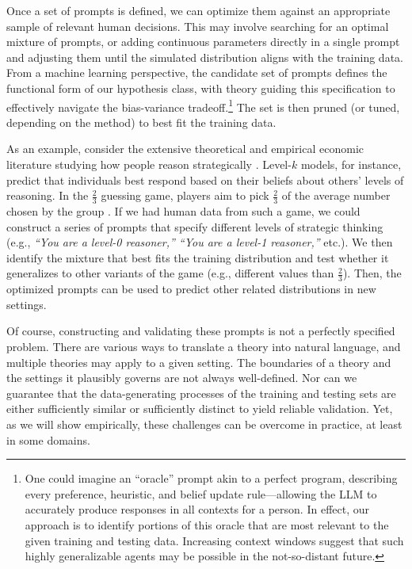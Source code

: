 \documentclass[11pt]{article}
\theoremstyle{definition}
\newcommand{\persona}{prompt}
\begin{document}
Once a set of \persona{s} is defined, we can optimize them against an appropriate sample of relevant human decisions.
This may involve searching for an optimal mixture of \persona{s}, or adding continuous parameters directly in a single prompt and adjusting them until the simulated distribution aligns with the training data.
From a machine learning perspective, the candidate set of \persona{s} defines the functional form of our hypothesis class, with theory guiding this specification to effectively navigate the bias-variance tradeoff.\footnote{One could imagine an ``oracle'' \persona{} akin to a perfect program, describing every preference, heuristic, and belief update rule---allowing the LLM to accurately produce responses in all contexts for a person.
In effect, our approach is to identify portions of this oracle that are most relevant to the given training and testing data.
Increasing context windows suggest that such highly generalizable agents may be possible in the not-so-distant future.}
The set is then pruned (or tuned, depending on the method) to best fit the training data.

As an example, consider the extensive theoretical and empirical economic literature studying how people reason strategically \citep{STAHL1994,STAHL1995,1120Arad2012, Camerer2004Cognitive}.
Level-$k$ models, for instance, predict that individuals best respond based on their beliefs about others' levels of reasoning. 
In the $\frac{2}{3}$ guessing game, players aim to pick $\frac{2}{3}$ of the average number chosen by the group \citep{LkNagel1995,keynes1936general}. 
If we had human data from such a game, we could construct a series of \persona{s} that specify different levels of strategic thinking (e.g., \emph{``You are a level-0 reasoner,'' ``You are a level-1 reasoner,''} etc.).
We then identify the mixture that best fits the training distribution and test whether it generalizes to other variants of the game (e.g., different values than $\frac{2}{3}$).
Then, the optimized \persona{s} can be used to predict other related distributions in new settings.

Of course, constructing and validating these \persona{s} is not a perfectly specified problem.
There are various ways to translate a theory into natural language, and multiple theories may apply to a given setting.
The boundaries of a theory and the settings it plausibly governs are not always well-defined.
Nor can we guarantee that the data-generating processes of the training and testing sets are either sufficiently similar or sufficiently distinct to yield reliable validation.
Yet, as we will show empirically, these challenges can be overcome in practice, at least in some domains.
\end{document}
